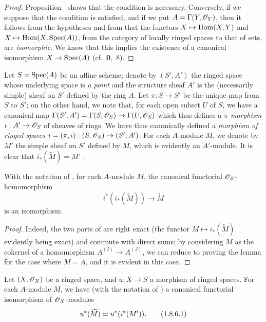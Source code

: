 \begin{proof}
\label{proof-1.1.8.3}
Proposition~ shows that the condition is necessary.
Conversely, if we suppose that the condition is satisfied, and if we put $A=\Gamma(Y,\mathscr{O}_Y)$, then it follows from the hypotheses and from  that the functors $X\mapsto\Hom(X,Y)$ and $X\mapsto\Hom(X,\Spec(A))$, from the category of locally ringed spaces to that of sets, are \emph{isomorphic}.
We know that this implies the existence of a canonical isomorphism $X\to\Spec(A)$ (cf.~\textbf{0},~8).
\end{proof}

\begin{env}[1.8.4]
\label{1.1.8.4}
Let $S=\operatorname{Spec}(A)$ be an affine scheme;
denote by $(S',A')$ the ringed space whose underlying space is \emph{a point} and the structure sheaf $A'$ is the (necessarily simple) sheaf on $S'$ defined by the ring $A$.
Let $\pi:S\to S'$ be the unique map from $S$ to $S'$;
on the other hand, we note that, for each open subset $U$ of $S$, we have a canonical map $\Gamma(S',A')=\Gamma(S,\sh{O}_S)\to\Gamma(U,\sh{O}_S)$ which thus defines a \emph{$\pi$-morphism} $\iota:A'\to\sh{O}_S$ of sheaves of rings.
We have thus canonically defined a \emph{morphism of ringed spaces $i=(\pi,\iota):(S,\sh{O}_S)\to(S',A')$}.
For each $A$-module $M$, we denote by $M'$ the simple sheaf on $S'$ defined by $M$, which is evidently an $A'$-module.
It is clear that $i_*(\widetilde{M})=M'$ .
\end{env}

\begin{lemma}[1.8.5]
\label{1.1.8.5}
With the notation of , for each $A$-module $M$, the canonical functorial $\mathscr{O}_S$-homomorphism 
\[
\label{eq:1.1.8.5.1}
  i^*(i_*(\widetilde{M}))\to\widetilde{M}
  \tag{1.8.5.1}
\]
is an isomorphism.
\end{lemma}

\begin{proof}
\label{proof-1.1.8.5}
Indeed, the two parts of  are right exact (the functor $M\mapsto i_*(\widetilde{M})$ evidently being exact) and commute with direct sums;
by considering $M$ as the cokernel of a homomorphism $A^{(I)}\to A^{(J)}$, we can reduce to proving the lemma for the case where $M=A$, and it is evident in this case.
\end{proof}

\begin{corollary}[1.8.6]
\label{1.1.8.6}
Let $(X,\mathscr{O}_X)$ be a ringed space, and $u:X\to S$ a morphism of ringed spaces.
For each $A$-module $M$, we have (with the notation of ) a canonical functorial isomorphism of $\mathscr{O}_X$-modules
\[
\label{eq:1.1.8.6.1}
  u^*(\widetilde{M})\simeq u^*(i^*(M')).
  \tag{1.8.6.1}
\]
\end{corollary}

